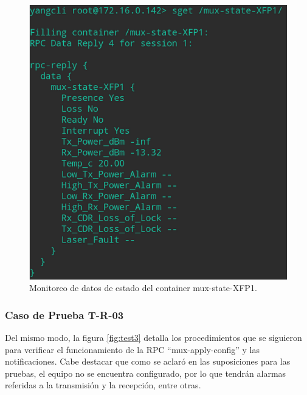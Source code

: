   \begin{figure}[H]
	\centering
	\includegraphics[scale=0.6]{Figures/test2_consulta.png}
	\caption{Monitoreo de datos de estado del container mux-state-XFP1.}
	\label{fig:test2_consulta}
  \end{figure}


  \subsubsection{Caso de Prueba T-R-03}
  Del mismo modo, la figura \ref{fig:test3} detalla los procedimientos que se siguieron para verificar el funcionamiento de la RPC “mux-apply-config” y las notificaciones. Cabe destacar que como se aclaró en las suposiciones para las pruebas, el equipo no se encuentra configurado, por lo que tendrán alarmas referidas a la transmisión y la recepción, entre otras. 



